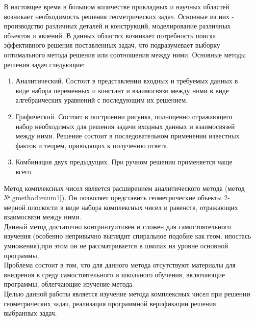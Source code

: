 



\lstset{language=[11]C++}

\thispagestyle{empty}
\clearpage

\tableofcontents

В настоящее время в большом количестве прикладных и научных областей возникает необходимость решения геометрических задач.
Основные из них - производство различных деталей и конструкций, моделирование различных объектов и явлений.
В данных областях возникает потребность поиска эффективного решения поставленных задач, что подразумевает выборку оптимального метода решения или соотношения между ними. Основные методы решения задач следующие\cite{geom:methods}:
\begin{enumerate}
    \item Аналитический. Состоит в представлении входных и требуемых данных в виде набора переменных и констант и взаимосвязи между ними в виде алгебраических уравнений с последующим их решением. \label{gmethod:enum1}
    \item Графический. Состоит в построении рисунка, полноценно отражающего набор необходимых для решения задачи входных данных и взаимосвязей между ними. Решение состоит в последовательном применении известных фактов и теорем, приводящих к получению ответа.
    \item Комбинация двух предыдущих. При ручном решении применяется чаще всего.
\end{enumerate}
Метод комплексных чисел является расширением аналитического метода (метод №\ref{gmethod:enum1}).
Он позволяет представить геометрические объекты 2-мерной плоскости в виде набора комплексных чисел и равенств, отражающих взаимосвязи между ними.\\
Данный метод достаточно контринтуитивен и сложен для самостоятельного изучения (особенно непривычно выглядит спиральное подобие как геом. ипостась умножения),при этом он не рассматривается в школах на уровне основной программы\cite{edu:problem},\cite[стр.6]{book:ponarin}.\\
Проблема состоит в том, что для данного метода отсутствуют материалы для внедрения в среду самостоятельного и школьного обучения, включающие программы, облегчающие изучение метода.\\
Целью данной работы является изучение метода комплексных чисел при решении геометрических задач, реализация программной верификации решения выбранных задач.\\
